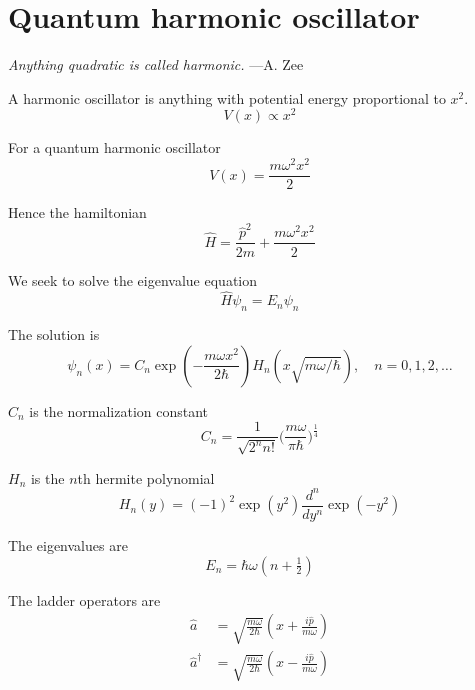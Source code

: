 

\section*{Quantum harmonic oscillator}

{\it Anything quadratic is called harmonic.} ---A. Zee

\bigskip
A harmonic oscillator is anything with potential energy proportional to $x^2$.
\begin{equation*}
V(x)\propto x^2
\end{equation*}

For a quantum harmonic oscillator
\begin{equation*}
V(x)=\frac{m\omega^2 x^2}{2}
\end{equation*}

Hence the hamiltonian
\begin{equation*}
\hat H=\frac{\hat p^2}{2m}+\frac{m\omega^2 x^2}{2}
\end{equation*}

We seek to solve the eigenvalue equation
\begin{equation*}
\hat H\psi_n=E_n\psi_n
\end{equation*}

The solution is
\begin{equation*}
\psi_n(x)=C_n\exp\left(-\frac{m\omega x^2}{2\hbar}\right)
H_n\left(x\sqrt{m\omega/\hbar}\right),\quad n=0,1,2,\ldots
\end{equation*}

$C_n$ is the normalization constant
\begin{equation*}
C_n=\frac{1}{\sqrt{2^nn!}}\biggl(\frac{m\omega}{\pi\hbar}\biggr)^{\frac{1}{4}}
\end{equation*}

$H_n$ is the $n$th hermite polynomial
\begin{equation*}
H_n(y)=(-1)^2\exp\left(y^2\right)\frac{d^n}{dy^n}\exp\left(-y^2\right)
\end{equation*}

The eigenvalues are
\begin{equation*}
E_n=\hbar\omega\left(n+\tfrac{1}{2}\right)
\end{equation*}

The ladder operators are
\begin{align*}
\hat a&=\sqrt{\frac{m\omega}{2\hbar}}\left(x+\frac{i\hat p}{m\omega}\right)
\\[1ex]
\hat a^\dag&=\sqrt{\frac{m\omega}{2\hbar}}\left(x-\frac{i\hat p}{m\omega}\right)
\end{align*}

